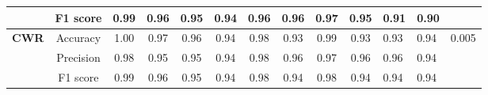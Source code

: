 \documentclass[12pt]{report}
\begin{document}
\begin{landscape}
\begin{table}[]
\begin{tabular}{cc|ccccccccllc}
                                                                                  & F1 score                            & 0.99                            & 0.96                            & 0.95                            & 0.94                            & 0.96                            & 0.96                            & 0.97                            & 0.95                            & 0.91                            & 0.90                            &                                                                                   \\ \hline
\multirow{3}{*}{\textbf{CWR}}                                                     & Accuracy                            & 1.00                            & 0.97                            & 0.96                            & 0.94                            & 0.98                            & 0.93                            & 0.99                            & 0.93                            & 0.93                            & 0.94                            & \multirow{3}{*}{0.005}                                                            \\ \cline{2-2}
                                                                                  & Precision                           & 0.98                            & 0.95                            & 0.95                            & 0.94                            & 0.98                            & 0.96                            & 0.97                            & 0.96                            & 0.96                            & 0.94                            &                                                                                   \\ \cline{2-2}
                                                                                  & F1 score                            & 0.99                            & 0.96                            & 0.95                            & 0.94                            & 0.98                            & 0.94                            & 0.98                            & 0.94                            & 0.94                            & 0.94                            &     
\end{tabular}
\label{table:openmv_bigtable}
\end{table}
\end{landscape}
\end{document}
